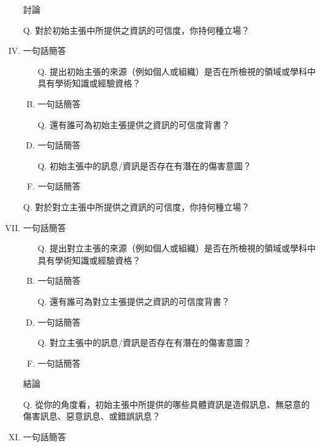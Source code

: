 \documentclass[a4paper, 12pt]{article}
\begin{document}
\begin{enumerate}[I.]
    \item [] %
    \item [] 討論
    \item [Q.] 對於{\color{blue}初始主張}中所提供之資訊的可信度，你持何種立場？
    \item {\color{gray}一句話簡答} %
          \begin{enumerate}[A.]
              \item [Q.]提出{\color{blue}初始主張}的來源（例如個人或組織）是否在所檢視的領域或學科中具有學術知識或經驗資格？
              \item {\color{gray}一句話簡答} %
              \item [Q.]還有誰可為{\color{blue}初始主張}提供之資訊的可信度背書？
              \item {\color{gray}一句話簡答}
              \item [Q.]{\color{blue}初始主張}中的訊息/資訊是否存在有潛在的傷害意圖？
              \item {\color{gray}一句話簡答}
          \end{enumerate}
    \item []
    \item [Q.] 對於{\color{red}對立主張}中所提供之資訊的可信度，你持何種立場？
    \item {\color{gray}一句話簡答} %
          \begin{enumerate}[A.]
              \item [Q.]提出{\color{red}對立主張}的來源（例如個人或組織）是否在所檢視的領域或學科中具有學術知識或經驗資格？
              \item {\color{gray}一句話簡答} %
              \item [Q.]還有誰可為{\color{red}對立主張}提供之資訊的可信度背書？
              \item {\color{gray}一句話簡答}
              \item [Q.]{\color{red}對立主張}中的訊息/資訊是否存在有潛在的傷害意圖？
              \item {\color{gray}一句話簡答}
          \end{enumerate}
    \item [] %
    \item [] 結論
    \item [Q.] 從你的角度看，{\color{blue}初始主張}中所提供的哪些具體資訊是造假訊息、無惡意的傷害訊息、惡意訊息、或錯誤訊息？
    \item {\color{gray}一句話簡答} %

\end{enumerate}
\end{document}
